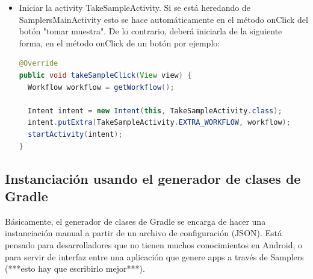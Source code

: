 \begin{itemize}
	\item Iniciar la activity TakeSampleActivity. Si se está heredando de SamplersMainActivity esto se hace automáticamente en el método onClick del botón "tomar muestra". De lo contrario, deberá iniciarla de la siguiente forma, en el método onClick de un botón por ejemplo:
		\begin{lstlisting}[language=Java, frame=tlb]
@Override
public void takeSampleClick(View view) {
  Workflow workflow = getWorkflow();

  Intent intent = new Intent(this, TakeSampleActivity.class);        
  intent.putExtra(TakeSampleActivity.EXTRA_WORKFLOW, workflow);
  startActivity(intent);
}		
		\end{lstlisting}

\end{itemize}


\subsection{Instanciación usando el  generador de clases de Gradle}

Básicamente, el generador de clases de Gradle se encarga de hacer una instanciación manual a partir de un archivo de configuración (JSON). Está pensado para desarrolladores que no tienen muchos conocimientos en Android, o para servir de interfaz entre una aplicación que genere apps a través de Samplers (***esto hay que escribirlo mejor***).

